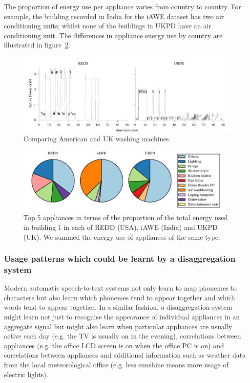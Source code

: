 \documentclass{sig-alternate}
\begin{document}
The proportion of energy use per appliance varies from country to
country. For example, the building recorded in India for the iAWE
dataset has two air conditioning units; whilst none of the buildings
in UKPD have an air conditioning unit.  The differences in appliance
energy use by country are illustrated in figure~\ref{fig:pie}.

\begin{figure}
  \centering
  \includegraphics{figures/wm.pdf}
  \caption{Comparing American and UK washing machines.}
  \label{fig:wm}
\end{figure} 

\begin{figure}
 \centering
 \includegraphics{figures/top_k_appliances_pie.pdf}
 \caption{Top 5 appliances in terms of the proportion of the total
   energy used in building 1 in each of REDD (USA), iAWE (India) and
   UKPD (UK). We summed the energy use of appliances of the same type.}
 \label{fig:pie}
\end{figure}

\subsubsection{Usage patterns which could be learnt by a disaggregation
  system}

\noindent
Modern automatic speech-to-text systems not only learn to map phonemes
to characters but also learn which phonemes tend to appear together
and which words tend to appear together.  In a similar fashion, a
disaggregation system might learn not just to recognise the appearance
of individual appliances in an aggregate signal but might also learn
when particular appliances are usually active each day (e.g. the TV is
usually on in the evening), correlations between appliances (e.g. the
office LCD screen is on when the office PC is on) and correlations
between appliances and additional information such as weather data
from the local meteorological office (e.g. less sunshine means more
usage of electric lights).
\end{document}
